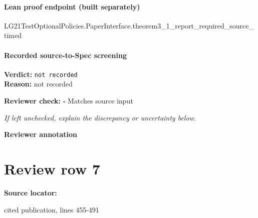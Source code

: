 \documentclass[10pt]{article}
\newcommand{\reviewerbox}{%
  \par\noindent\fbox{\parbox{0.96\linewidth}{\rule{0pt}{0.38in}}}\par
}
\newcommand{\reviewmatch}[1]{%
  \par\noindent\textbf{Reviewer check:} $\square$\; #1\par
  \noindent\emph{If left unchecked, explain the discrepancy or uncertainty below.}\par
}
\begin{document}
\paragraph{Lean proof endpoint (built separately)}\begin{ReviewVerbatim}
LG21TestOptionalPolicies.PaperInterface.theorem3_1_report_required_source_timed
\end{ReviewVerbatim}

\paragraph{Recorded source-to-Spec screening}
\textbf{Verdict:} \texttt{not recorded}
\\
\textbf{Reason:} not recorded
\reviewmatch{Matches source input}
\noindent\textbf{Reviewer annotation}\par
\reviewerbox
\clearpage
\hypertarget{source-claim-1fc46568cc4fe01e}{}
\section*{Review row 7}
\textbf{Source locator:} {\footnotesize\raggedright cited publication, lines 455-\allowbreak{}491\par}
\end{document}
